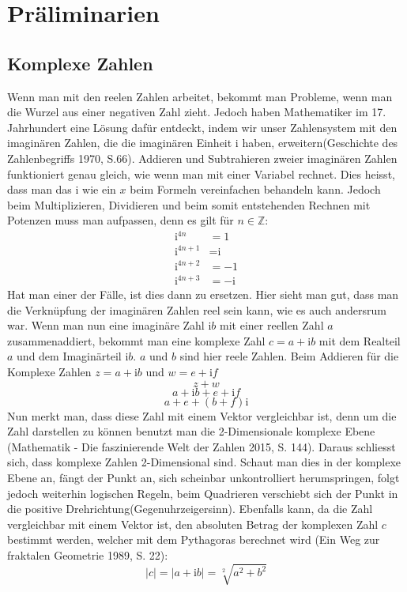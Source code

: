 \section{Präliminarien}
\subsection{Komplexe Zahlen}
Wenn man mit den reelen Zahlen arbeitet, bekommt man Probleme, wenn man die Wurzel aus einer negativen Zahl zieht. Jedoch haben Mathematiker im 17. Jahrhundert eine Lösung dafür entdeckt, indem wir unser Zahlensystem mit den imaginären Zahlen, die die imaginären Einheit i haben, erweitern(Geschichte des Zahlenbegriffs 1970, S.66). Addieren und Subtrahieren zweier imaginären Zahlen funktioniert genau gleich, wie wenn man mit einer Variabel rechnet. Dies heisst, dass man das i wie ein $x$ beim Formeln vereinfachen behandeln kann. Jedoch beim Multiplizieren, Dividieren und beim somit entstehenden Rechnen mit Potenzen muss man aufpassen, denn es gilt für $n \in \mathbb{Z}$:
\begin{align*}
 \text{i}^{4n} &= 1 \\
\text{i}^{4n+1} &= \text{i} \\
\text{i}^{4n+2} &= -1 \\
\text{i}^{4n+3} &= -\text{i}
\end{align*}
Hat man einer der Fälle, ist dies dann zu ersetzen. Hier sieht man gut, dass man die Verknüpfung der imaginären Zahlen reel sein kann, wie es auch andersrum war. Wenn man nun eine imaginäre Zahl $\text{i}b$ mit einer reellen Zahl $a$ zusammenaddiert, bekommt man eine komplexe Zahl  $c=a+\text{i}b$ mit dem Realteil $a$ und dem Imaginärteil $\text{i}b$. $a$ und $b$ sind hier reele Zahlen. Beim Addieren für die Komplexe Zahlen $z=a+\text{i}b$ und $w=e+\text{i}f$
\[z+w\]
\[a+\text{i}b+e+\text{i}f\]
\[a+e+(b+f)\text{i}\]
Nun merkt man, dass diese Zahl mit einem Vektor vergleichbar ist, denn um die Zahl darstellen zu können benutzt man die 2-Dimensionale komplexe Ebene (Mathematik - Die faszinierende Welt der Zahlen 2015, S. 144). Daraus schliesst sich, dass komplexe Zahlen 2-Dimensional sind. Schaut man dies in der komplexe Ebene an, fängt der Punkt an, sich scheinbar unkontrolliert herumspringen, folgt jedoch weiterhin logischen Regeln, beim Quadrieren verschiebt sich der Punkt in die positive Drehrichtung(Gegenuhrzeigersinn). Ebenfalls kann, da die Zahl vergleichbar mit einem Vektor ist, den absoluten Betrag der komplexen Zahl $c$ bestimmt werden, welcher mit dem Pythagoras berechnet wird (Ein Weg zur fraktalen Geometrie 1989, S. 22):
\[|c| = |a+\text{i}b| = \sqrt[2]{a^2+b^2}\]

